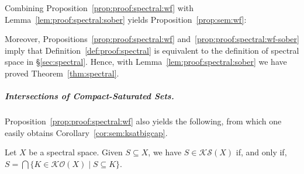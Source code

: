 \documentclass[%
  a4paper,
  UKenglish,
  cleveref,
  autoref,
  thm-restate,
  numberwithinsect,
]{lipics-v2021}
\newcommand\sle\subseteq
\newcommand\SP{S}			%
\newcommand\Open{\mathcal{O}}		%
\newcommand\K{\mathcal{K}}		%
\newcommand\Sat{\mathcal{S}}		%
\begin{document}
Combining Proposition~\ref{prop:proof:spectral:wf}
with Lemma~\ref{lem:proof:spectral:sober}
yields Proposition~\ref{prop:sem:wf}:

\PropWellFilt*

Moreover, Propositions~\ref{prop:proof:spectral:wf}
and~\ref{prop:proof:spectral:wf-sober}
imply that Definition~\ref{def:proof:spectral}
is equivalent to 
the definition of spectral space in \S\ref{sec:spectral}.
Hence, with Lemma~\ref{lem:proof:spectral:sober}
we have proved Theorem~\ref{thm:spectral}.

\ThmScottSpectral*

\subparagraph*{Intersections of Compact-Saturated Sets.}

Proposition~\ref{prop:proof:spectral:wf} also yields the following,
from which one easily obtains Corollary~\ref{cor:sem:ksatbigcap}.

\begin{lemma}
\label{lem:proof:spectral:ksat}
Let $X$ be a spectral space.
Given $\SP \sle X$,
we have $\SP \in \K\Sat(X)$
if, and only if,
$\SP = \bigcap \{ K \in \K\Open(X) \mid \SP \sle K\}$.
\end{lemma}
\end{document}
